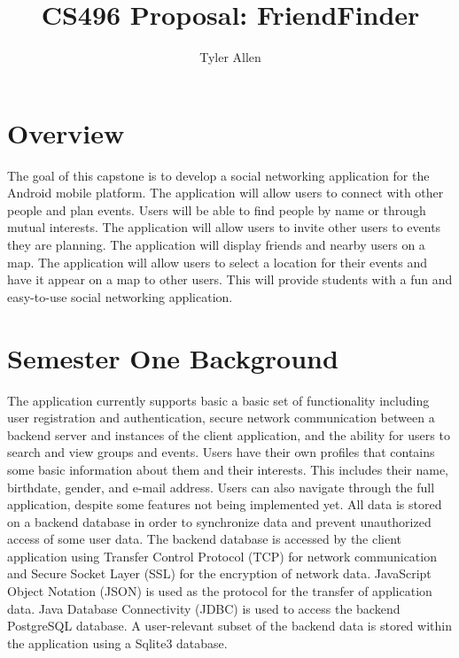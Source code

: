 \documentclass[11pt]{article}
\begin{document}
\title{CS496 Proposal: FriendFinder}
\author{Tyler Allen}
\maketitle

\section{Overview}

The goal of this capstone is to develop a social networking application for 
the Android mobile platform. The application will allow users to connect with other people and 
plan events. Users will be able to find people by name or through mutual interests. The application
will allow users to invite other users to events they are planning. The application will display 
friends and nearby users on a map. The application will allow users to select 
a location for their events and have it appear on a map to other users.
This will provide students with a fun and easy-to-use social networking
application.\\

\section{Semester One Background}
The application currently supports basic a basic set of functionality including
user registration and authentication, secure network communication between 
a backend server and instances of the client application, and the ability for users 
to search and view groups and events. Users have their own profiles that contains some basic 
information about them and their interests. This includes their name, birthdate, 
gender, and e-mail address. Users can also navigate through the full application,
despite some features not being implemented yet. All data is stored on a backend database in order
to synchronize data and prevent unauthorized access of some user data. The backend
database is accessed by the client application using Transfer Control Protocol (TCP)
for network communication and Secure Socket Layer (SSL) for the encryption of 
network data. JavaScript Object Notation (JSON) is used as the protocol for the 
transfer of application data. Java Database Connectivity (JDBC) is used to 
access the backend PostgreSQL database. A user-relevant subset of the backend data is 
stored within the application using a Sqlite3 database. \\
\end{document}
